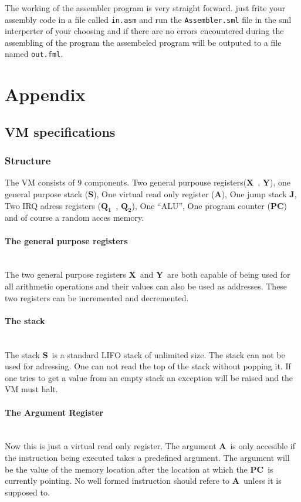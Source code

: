 \documentclass{article}
\newcommand{\V}{\verb}
\newcommand{\x}{$\textbf{X}$}
\newcommand{\y}{$\textbf{Y}$}
\newcommand{\s}{$\textbf{S}$}
\newcommand{\A}{$\textbf{A}$}
\newcommand{\q}{$\textbf{Q}_{\textbf{1}}$}
\newcommand{\qq}{$\textbf{Q}_{\textbf{2}}$}
\newcommand{\pc}{$\textbf{PC}$}
\newcommand{\J}{$\textbf{J}$}
\begin{document}
The working of the assembler program is very straight forward. just frite your
assembly code in a file called \V+in.asm+ and run the \V+Assembler.sml+ file in
the sml interperter of your choosing and if there are no errors encountered during
the assembling of the program the assembeled program will be outputed to a file
named \V+out.fml+.

\section{Appendix}
\subsection{VM specifications}
\subsubsection{Structure} 
The VM consists of 9 components. Two general purpouse registers(\x \ , \y ), one
general purpose stack (\s), One virtual read only register (\A), One jump stack
\J, Two IRQ adress registers (\q \ , \qq), One ``ALU'', One program counter
(\pc) and of course a random acces memory.

\paragraph{The general purpose registers} \
\\
The two general purpose registers \x \ and \y \ are both capable of being used
for all arithmetic operations and their values can also be used as addresses.
These two registers can be incremented and decremented.

\paragraph{The stack} \
\\
The stack \s \ is a standard LIFO stack of unlimited size. The stack can not be
used for adressing. One can not read the top of the stack without popping it. If
one tries to get a value from an empty stack an exception will be raised and the
VM must halt.

\paragraph{The Argument Register} \
\\
Now this is just a virtual read only register. The argument \A \  is only
accesible if the instruction being executed takes a predefined argument. The
argument will be the value of the memory location after the location at which
the \pc \  is currently pointing. No well formed instruction should refere to
\A \ unless it is supposed to.
\end{document}
